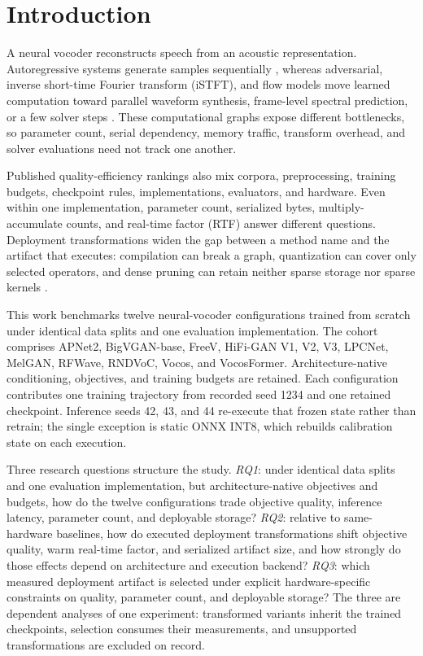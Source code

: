 \section{Introduction}
\label{sec:introduction}

A neural vocoder reconstructs speech from an acoustic representation.
Autoregressive systems generate samples sequentially
\citep{oord2016wavenet}, whereas adversarial, inverse short-time Fourier
transform (iSTFT), and flow models move learned computation toward parallel
waveform synthesis, frame-level spectral prediction, or a few solver steps
\citep{kong2020hifigan,siuzdak2024vocos,liu2025rfwave}.  These computational
graphs expose different bottlenecks, so parameter count, serial dependency,
memory traffic, transform overhead, and solver evaluations need not track
one another.

Published quality-efficiency rankings also mix corpora, preprocessing,
training budgets, checkpoint rules, implementations, evaluators, and
hardware.  Even within one implementation, parameter count, serialized
bytes, multiply-accumulate counts, and real-time factor (RTF) answer
different questions.  Deployment transformations widen the gap between a
method name and the artifact that executes: compilation can break a graph,
quantization can cover only selected operators, and dense pruning can retain
neither sparse storage nor sparse kernels
\citep{han2015pruning,jacob2018quantization,ansel2024pytorch2}.

This work benchmarks twelve neural-vocoder configurations trained from
scratch under identical data splits and one evaluation implementation.  The
cohort comprises APNet2, BigVGAN-base, FreeV, HiFi-GAN V1, V2, V3, LPCNet,
MelGAN, RFWave, RNDVoC, Vocos, and VocosFormer.  Architecture-native
conditioning, objectives, and training budgets are retained.  Each configuration
contributes one training trajectory from recorded seed 1234 and one retained
checkpoint.  Inference seeds 42, 43, and 44 re-execute that frozen state
rather than retrain; the single exception is static ONNX INT8, which
rebuilds calibration state on each execution.

Three research questions structure the study.  \emph{RQ1}: under identical
data splits and one evaluation implementation, but
architecture-native objectives and budgets, how do the twelve
configurations trade objective quality, inference latency,
parameter count, and deployable storage?  \emph{RQ2}: relative to
same-hardware baselines, how do executed deployment transformations shift
objective quality, warm real-time factor, and serialized artifact size,
and how strongly do those effects depend on architecture and execution
backend?  \emph{RQ3}: which measured deployment artifact is selected under
explicit hardware-specific constraints on quality, parameter count,
and deployable storage?  The three are dependent analyses of one
experiment: transformed variants inherit the trained checkpoints, selection
consumes their measurements, and unsupported transformations are excluded
on record.

